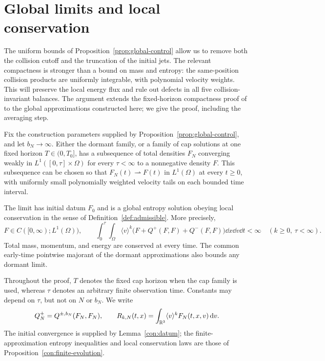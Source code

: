 \section{Global limits and local conservation}\label{sec:compactness}

The uniform bounds of Proposition~\ref{prop:global-control} allow us to
remove both the collision cutoff and the truncation of the initial jets.
The relevant compactness is stronger than a bound on mass and entropy:
the same-position collision products are uniformly integrable, with
polynomial velocity weights. This will preserve the local energy flux
and rule out defects in all five collision-invariant balances.
The argument extends the fixed-horizon compactness proof of
\cite[Section~6]{OpenAIPeriodic} to the global approximations constructed
here; we give the proof, including the averaging step.

\begin{proposition}\label{prop:global-limits}
Fix the construction parameters supplied by
Proposition~\ref{prop:global-control}, and let $b_N\to\infty$.
Either the dormant family, or a family of cap solutions at one fixed horizon
$T\in(0,T_0]$, has a subsequence of total densities $F_N$ converging
weakly in $L^1([0,\tau]\times\Omega)$ for every $\tau<\infty$ to a
nonnegative density $F$. This subsequence can be chosen so that
$F_N(t)\rightharpoonup F(t)$ in $L^1(\Omega)$ at every $t\ge0$,
with uniformly small polynomially weighted velocity tails on each
bounded time interval.

The limit has initial datum $F_0$ and is a global entropy solution
obeying local conservation in the sense of
Definition~\ref{def:admissible}. More precisely,
\begin{equation}\label{comp:strong-properties}
 F\in C([0,\infty);L^1(\Omega)),\qquad
 \int_0^\tau\!\int_\Omega
 \langle v\rangle^k\bigl(F+Q^+(F,F)+Q^-(F,F)\bigr)
 \dd x\dd v\dd t<\infty
 \quad(k\ge0,\ \tau<\infty).
\end{equation}
Total mass, momentum, and energy are conserved at every time.
The common early-time pointwise majorant of the dormant approximations
also bounds any dormant limit.
\end{proposition}

Throughout the proof, $T$ denotes the fixed cap horizon when the cap
family is used, whereas $\tau$ denotes an arbitrary finite observation
time. Constants may depend on $\tau$, but not on $N$ or $b_N$.
We write
\[
 Q_N^\pm=Q^{\pm,b_N}(F_N,F_N),\qquad
 R_{k,N}(t,x)=\int_{\mathbb R^3}\langle v\rangle^kF_N(t,x,v)\,\mathrm d v.
\]
The initial convergence is supplied by Lemma~\ref{con:datum};
the finite-approximation entropy inequalities and local conservation
laws are those of Proposition~\ref{con:finite-evolution}.

